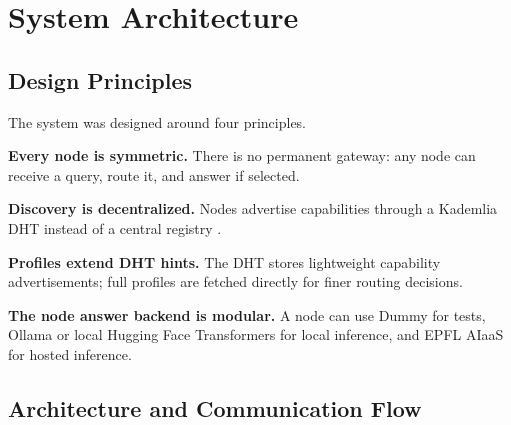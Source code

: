 \section{System Architecture}

\subsection{Design Principles}

The system was designed around four principles.

\textbf{Every node is symmetric.} There is no permanent gateway: any node can
receive a query, route it, and answer if selected.

\textbf{Discovery is decentralized.} Nodes advertise capabilities through a
Kademlia DHT instead of a central registry \citep{maymounkov2002kademlia}.

\textbf{Profiles extend DHT hints.} The DHT stores lightweight capability
advertisements; full profiles are fetched directly for finer routing decisions.

\textbf{The node answer backend is modular.} A node can use Dummy for tests,
Ollama or local Hugging Face Transformers for local inference, and EPFL AIaaS
for hosted inference.

\subsection{Architecture and Communication Flow}

